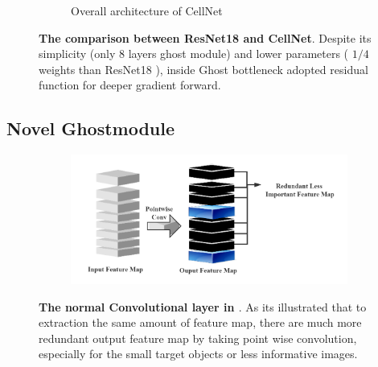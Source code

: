\begin{figure}[h]
\begin{center}
\begin{subfigure}[t]{0.49\textwidth}
			\caption{Overall architecture of CellNet}
			\label{fig:cellnet}
		\end{subfigure}
	\end{center}
	\caption{\textbf{The comparison between ResNet18 \cite{b20} and CellNet}. Despite its simplicity (only 8 layers ghost module) and lower parameters ( $1/4$ weights than ResNet18 \cite{b20}), inside Ghost bottleneck adopted residual function for deeper gradient forward.}
\end{figure}








\subsection{Novel Ghostmodule} %
\label{sub:amet}

\begin{figure}[h]
	\begin{center}
		\begin{subfigure}[b]{\textwidth}
		    \centering
			\includegraphics[width=\textwidth]{thesis-template-master/images/normal conv.png}
			
			\label{fig:cellnet}
		\end{subfigure}
	\end{center}
	\caption{\textbf{The normal Convolutional layer in \cite{b26}\cite{b27}\cite{b28}}. As its illustrated that to extraction the same amount of feature map, there are much more redundant output feature map by taking point wise convolution, especially for the small target objects or less informative images.}
\end{figure}


